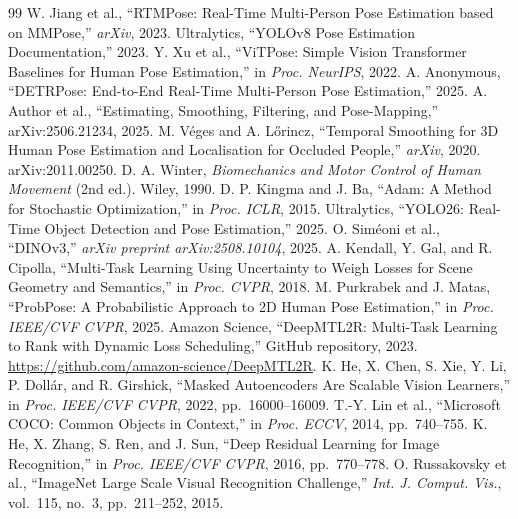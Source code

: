 \documentclass[conference,onecolumn,oneside]{IEEEtran}
\begin{document}
\begin{thebibliography}{99}
 W. Jiang et al., ``RTMPose: Real-Time Multi-Person Pose Estimation based on MMPose,'' \textit{arXiv}, 2023.
 Ultralytics, ``YOLOv8 Pose Estimation Documentation,'' 2023.
 Y. Xu et al., ``ViTPose: Simple Vision Transformer Baselines for Human Pose Estimation,'' in \textit{Proc. NeurIPS}, 2022.
 A. Anonymous, ``DETRPose: End-to-End Real-Time Multi-Person Pose Estimation,'' 2025.
 A. Author et al., ``Estimating, Smoothing, Filtering, and Pose-Mapping,'' arXiv:2506.21234, 2025.
 M. V\'eges and A. L\H{o}rincz, ``Temporal Smoothing for 3D Human Pose Estimation and Localisation for Occluded People,'' \textit{arXiv}, 2020. arXiv:2011.00250.
 D. A. Winter, \textit{Biomechanics and Motor Control of Human Movement} (2nd ed.). Wiley, 1990.
 D. P. Kingma and J. Ba, ``Adam: A Method for Stochastic Optimization,'' in \textit{Proc. ICLR}, 2015.
 Ultralytics, ``YOLO26: Real-Time Object Detection and Pose Estimation,'' 2025.
 O. Sim\'eoni et al., ``DINOv3,'' \textit{arXiv preprint arXiv:2508.10104}, 2025.
 A. Kendall, Y. Gal, and R. Cipolla,
``Multi-Task Learning Using Uncertainty to Weigh Losses for Scene
Geometry and Semantics,'' in \textit{Proc. CVPR}, 2018.
 M. Purkrabek and J. Matas,
``ProbPose: A Probabilistic Approach to 2D Human Pose Estimation,''
in \textit{Proc. IEEE/CVF CVPR}, 2025.
 Amazon Science, ``DeepMTL2R: Multi-Task Learning
to Rank with Dynamic Loss Scheduling,'' GitHub repository, 2023.
\url{https://github.com/amazon-science/DeepMTL2R}.
 K. He, X. Chen, S. Xie, Y. Li, P. Doll{\'a}r, and R. Girshick,
``Masked Autoencoders Are Scalable Vision Learners,''
in \textit{Proc. IEEE/CVF CVPR}, 2022, pp.~16000--16009.
 T.-Y. Lin et al.,
``Microsoft COCO: Common Objects in Context,''
in \textit{Proc. ECCV}, 2014, pp.~740--755.
 K. He, X. Zhang, S. Ren, and J. Sun,
``Deep Residual Learning for Image Recognition,''
in \textit{Proc. IEEE/CVF CVPR}, 2016, pp.~770--778.
 O. Russakovsky et al.,
``ImageNet Large Scale Visual Recognition Challenge,''
\textit{Int. J. Comput. Vis.}, vol.~115, no.~3, pp.~211--252, 2015.
\end{thebibliography}
\end{document}
